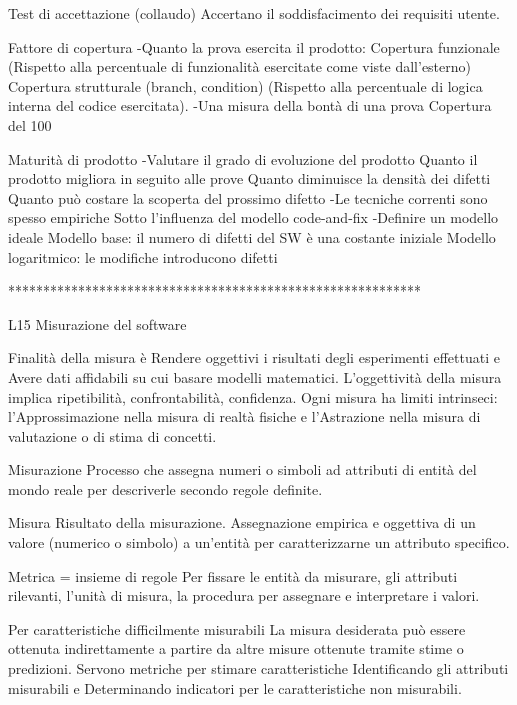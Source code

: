 \documentclass{report}
\begin{document}
Test di accettazione (collaudo) Accertano il soddisfacimento dei requisiti utente.

Fattore di copertura
-Quanto la prova esercita il prodotto:
Copertura funzionale (Rispetto alla percentuale di funzionalità esercitate come viste dall’esterno)
Copertura strutturale (branch, condition) (Rispetto alla percentuale di logica interna del codice esercitata).
-Una misura della bontà di una prova
Copertura del 100%

Maturità di prodotto
-Valutare il grado di evoluzione del prodotto
Quanto il prodotto migliora in seguito alle prove
Quanto diminuisce la densità dei difetti
Quanto può costare la scoperta del prossimo difetto
-Le tecniche correnti sono spesso empiriche
Sotto l’influenza del modello code-and-fix
-Definire un modello ideale
Modello base: il numero di difetti del SW è una costante iniziale
Modello logaritmico: le modifiche introducono difetti

***********************************************************

L15 Misurazione del software

Finalità della misura è Rendere oggettivi i risultati degli esperimenti effettuati e Avere dati affidabili su cui basare modelli matematici.
L’oggettività della misura implica ripetibilità, confrontabilità, confidenza.
Ogni misura ha limiti intrinseci: l'Approssimazione nella misura di realtà fisiche e l'Astrazione nella misura di valutazione o di stima di concetti.

Misurazione
Processo che assegna numeri o simboli ad attributi di entità del mondo reale per descriverle secondo regole definite.

Misura
Risultato della misurazione.
Assegnazione empirica e oggettiva di un valore (numerico o simbolo) a un’entità per caratterizzarne un attributo specifico.

Metrica = insieme di regole
Per fissare le entità da misurare, gli attributi rilevanti, l’unità di misura, la procedura per assegnare e interpretare i valori.

Per caratteristiche difficilmente misurabili La misura desiderata può essere ottenuta indirettamente a partire da altre misure ottenute tramite stime o predizioni.
Servono metriche per stimare caratteristiche Identificando gli attributi misurabili e Determinando indicatori per le caratteristiche non misurabili.
\end{document}
